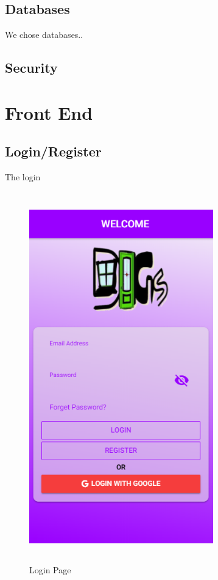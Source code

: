 \subsection{Databases}
We chose databases..


\subsection{Security}

\section{Front End }

\subsection{Login/Register}
\par The login 

\begin{figure}[h]
\centering
\includegraphics[width=8cm, height=16cm]{img/loginScreen}
\caption{Login Page}
\end{figure}

